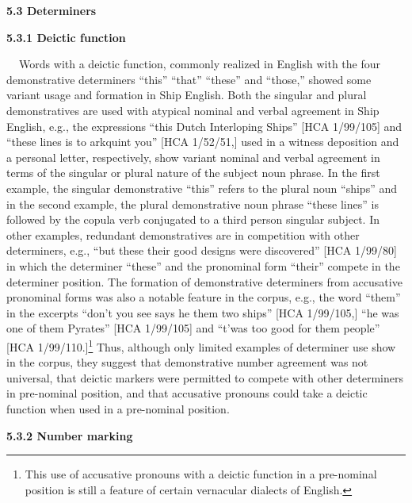 \begin{styleStandard}
\textbf{5.3 Determiners}
\end{styleStandard}

\begin{styleStandard}
\textbf{5.3.1 Deictic function}
\end{styleStandard}

\begin{styleStandard}
\textbf{\ \ }Words with a deictic function, commonly realized in English with the four demonstrative determiners “this” “that” “these” and “those,” showed some variant usage and formation in Ship English. Both the singular and plural demonstratives are used with atypical nominal and verbal agreement in Ship English, e.g., the expressions “this Dutch Interloping Ships” [HCA 1/99/105] and “these lines is to arkquint you” [HCA 1/52/51,] used in a witness deposition and a personal letter, respectively, show variant nominal and verbal agreement in terms of the singular or plural nature of the subject noun phrase. In the first example, the singular demonstrative “this” refers to the plural noun “ships” and in the second example, the plural demonstrative noun phrase “these lines” is followed by the copula verb conjugated to a third person singular subject. In other examples, redundant demonstratives are in competition with other determiners, e.g., “but these their good designs were discovered” [HCA 1/99/80] in which the determiner “these” and the pronominal form “their” compete in the determiner position. The formation of demonstrative determiners from accusative pronominal forms was also a notable feature in the corpus, e.g., the word “them” in the excerpts “don’t you see says he them two ships” [HCA 1/99/105,] “he was one of them Pyrates” [HCA 1/99/105] and “t’was too good for them people” [HCA 1/99/110.]\footnote{ This use of accusative pronouns with a deictic function in a pre-nominal position is still a feature of certain vernacular dialects of English.} Thus, although only limited examples of determiner use show in the corpus, they suggest that demonstrative number agreement was not universal, that deictic markers were permitted to compete with other determiners in pre-nominal position, and that accusative pronouns could take a deictic function when used in a pre-nominal position. \ 
\end{styleStandard}

\begin{styleStandard}
\textbf{5.3.2 Number marking}
\end{styleStandard}

